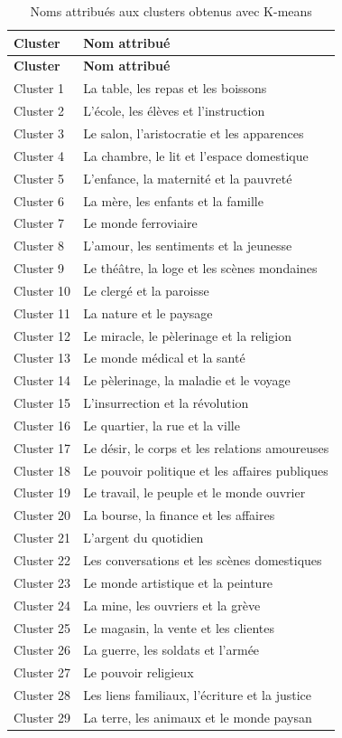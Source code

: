 \begin{longtable}{p{2cm}p{11cm}}
\caption{Noms attribués aux clusters obtenus avec K-means} \\
\toprule
\textbf{Cluster} & \textbf{Nom attribué} \\
\midrule
\endfirsthead

\toprule
\textbf{Cluster} & \textbf{Nom attribué} \\
\midrule
\endhead
Cluster 1 & La table, les repas et les boissons \\
Cluster 2 & L'école, les élèves et l'instruction \\
Cluster 3 & Le salon, l'aristocratie et les apparences \\
Cluster 4 & La chambre, le lit et l'espace domestique \\
Cluster 5 & L'enfance, la maternité et la pauvreté \\
Cluster 6 & La mère, les enfants et la famille \\
Cluster 7 & Le monde ferroviaire \\
Cluster 8 & L'amour, les sentiments et la jeunesse \\
Cluster 9 & Le théâtre, la loge et les scènes mondaines \\
Cluster 10 & Le clergé et la paroisse \\
Cluster 11 & La nature et le paysage \\
Cluster 12 & Le miracle, le pèlerinage et la religion \\
Cluster 13 & Le monde médical et la santé \\
Cluster 14 & Le pèlerinage, la maladie et le voyage \\
Cluster 15 & L'insurrection et la révolution \\
Cluster 16 & Le quartier, la rue et la ville \\
Cluster 17 & Le désir, le corps et les relations amoureuses \\
Cluster 18 & Le pouvoir politique et les affaires publiques \\
Cluster 19 & Le travail, le peuple et le monde ouvrier \\
Cluster 20 & La bourse, la finance et les affaires \\
Cluster 21 & L'argent du quotidien \\
Cluster 22 & Les conversations et les scènes domestiques \\
Cluster 23 & Le monde artistique et la peinture \\
Cluster 24 & La mine, les ouvriers et la grève \\
Cluster 25 & Le magasin, la vente et les clientes \\
Cluster 26 & La guerre, les soldats et l'armée \\
Cluster 27 & Le pouvoir religieux \\
Cluster 28 & Les liens familiaux, l'écriture et la justice \\
Cluster 29 & La terre, les animaux et le monde paysan \\
\bottomrule
\end{longtable}

